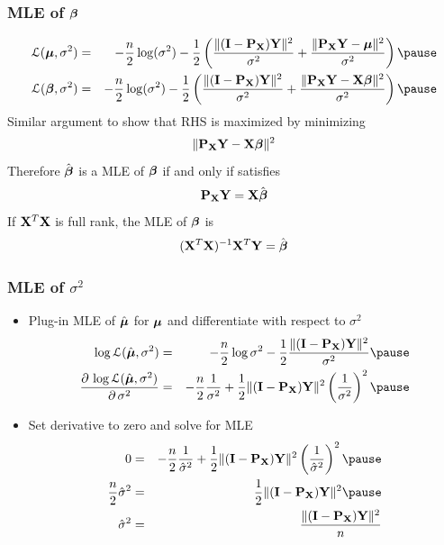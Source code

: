 \documentclass[handout]{beamer}
\begin{document}
\begin{frame}
  \frametitle{MLE of $\boldsymbol{\beta}$}
  \begin{eqnarray*}
   \cL(\mub, \sigma^2)  & = & -\frac{n}{2} \log(\sigma^2)  - \frac 1 2 \left( \frac{\|(\I - \P_\X)
  \Y \|^2}{\sigma^2} + \frac{\| \P_\X \Y - \mub\|^2 } {\sigma^2} \right)  \pause \\
 \cL(\b, \sigma^2 ) & = & -\frac{n}{2} \log(\sigma^2)  - \frac 1 2 \left( \frac{\|(\I - \P_\X)
  \Y \|^2}{\sigma^2} + \frac{\| \P_\X \Y - \X\b\|^2 } {\sigma^2}
\right)  \pause
\end{eqnarray*}
Similar argument to show that RHS is maximized by minimizing $$\| \mathbf{P}_{\mathbf{X}}
\mathbf{Y} - \mathbf{X}\boldsymbol{\beta}\|^2$$ \pause
Therefore $\hat{\boldsymbol{\beta}}$ is  a MLE of $\boldsymbol{\beta}$ if and only if satisfies
$$ \mathbf{P}_{\mathbf{X}} \mathbf{Y} = \mathbf{X} \hat{\boldsymbol{\beta}}$$ \pause
If $\mathbf{X}^T\mathbf{X}$ is full rank, the MLE of $\boldsymbol{\beta}$ is $$(\mathbf{X}^T\mathbf{X})^{-1}\mathbf{X}^T\mathbf{Y} = \hat{\boldsymbol{\beta}}$$
\end{frame}

\begin{frame}
  \frametitle{MLE of $\sigma^2$}
  \begin{itemize}
  \item Plug-in MLE of $\hat{\boldsymbol{\mu}}$ for $\boldsymbol{\mu}$ and differentiate  with
    respect to $\sigma^2$ \pause
    \begin{eqnarray*}
 \log \cL(\muhat, \sigma^2) & = &  -\frac{n}{2} \log \sigma^2 - \frac 1 2
\frac{\| (\I - \P_\X) \Y \|^2  }{\sigma^2}   \pause \\
\frac{\partial \, \log \cL(\muhat, \sigma^2)}{\partial \, \sigma^2} &
= &  -\frac{n}{2} \frac{1}{\sigma^2}  +  \frac 1 2
\| (\I - \P_\X) \Y \|^2 \left(\frac{1}{\sigma^2}\right)^2 \pause
    \end{eqnarray*}
\item Set derivative to zero and solve for MLE
  \begin{eqnarray*}
0 & = &  -\frac{n}{2} \frac{1}{\shat}  +  \frac 1 2
\| (\I - \P_\X) \Y \|^2 \left(\frac{1}{\shat}\right)^2 \pause \\
\frac{n}{2} \shat & = & \frac 1 2
\| (\I - \P_\X) \Y \|^2 \pause \\
\shat & = & \frac{\| (\I - \P_\X) \Y \|^2}{n}
  \end{eqnarray*}
  \end{itemize}
\end{frame}
\end{document}
